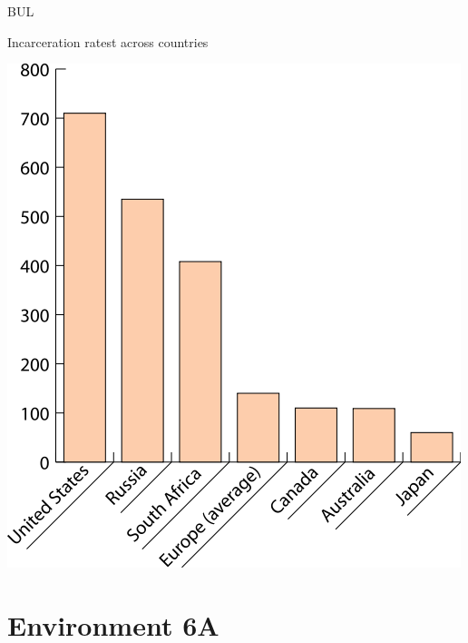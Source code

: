 \lipsum[1-2]

\begin{chart}{B}{UL}
\caption{Incarceration ratest across countries}
\label{chart:incarceration}
\includegraphics[width=\chartwidth,height=\chartheight]{incarceration}  
\end{chart}



\section{Environment 6A}

\lipsum[1-4]

